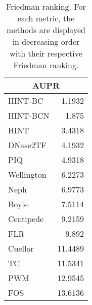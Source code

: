 \documentclass[landscape, 8pt]{report}
\begin{document}
\begin{table}[h!]
\label{tab:ranking}
\vspace{0.0cm}
\begin{center}
\caption{Friedman ranking. For each metric, the methods are displayed in decreasing order with their respective Friedman ranking.}
\renewcommand{\arraystretch}{1.2}
  \begin{tabular}{ |lr| }
    \hline
    \multicolumn{2}{|c|}{\textbf{AUPR}} \\
    \hline
    HINT-BC & 1.1932 \\
    HINT-BCN & 1.875 \\
    HINT & 3.4318 \\
    DNase2TF & 4.1932 \\
    PIQ & 4.9318 \\
    Wellington & 6.2273 \\
    Neph & 6.9773 \\
    Boyle & 7.5114 \\
    Centipede & 9.2159 \\
    FLR & 9.892 \\
    Cuellar & 11.4489 \\
    TC & 11.5341 \\
    PWM & 12.9545 \\
    FOS & 13.6136 \\
    \hline
  \end{tabular}
\end{center}
\vspace{0.0cm}
\end{table}
\end{document}
